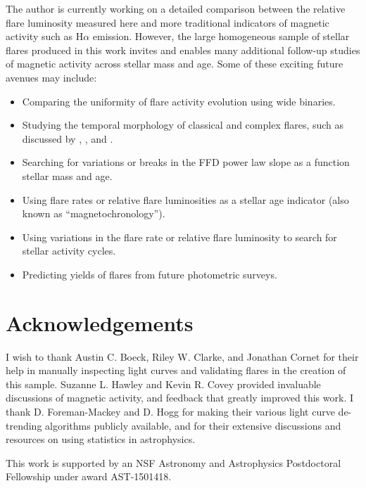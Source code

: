 \documentclass[twocolumn]{aastex6}
\begin{document}
The author is currently working on a detailed comparison between the relative flare luminosity measured here and more traditional indicators of magnetic activity such as H$\alpha$ emission. However, the large homogeneous sample of stellar flares produced in this work invites and enables many additional follow-up studies of magnetic activity across stellar mass and age. Some of these exciting future avenues may include:
\begin{itemize}
\item Comparing the uniformity of flare activity evolution using wide binaries.
\item Studying the temporal morphology of classical and complex flares, such as discussed by \citet{davenport2014b}, \citet{balona2015}, and \citet{davenport2015c}.
\item Searching for variations or breaks in the FFD power law slope as a function stellar mass and age.
\item Using flare rates or relative flare luminosities as a stellar age indicator (also known as ``magnetochronology'').
\item Using variations in the flare rate or relative flare luminosity to search for stellar activity cycles.
\item Predicting yields of flares from future photometric surveys.
\end{itemize}










\section*{Acknowledgements}


I wish to thank Austin C. Boeck, Riley W. Clarke, and Jonathan Cornet for their help in manually inspecting light curves and validating flares in the creation of this sample. Suzanne L. Hawley and Kevin R. Covey provided invaluable discussions of magnetic activity, and feedback that greatly improved this work. I thank D. Foreman-Mackey and D. Hogg for making their various light curve de-trending algorithms publicly available, and for their extensive discussions and resources on using statistics in astrophysics. 

This work is supported by an NSF Astronomy and Astrophysics Postdoctoral Fellowship under award AST-1501418.
\end{document}
